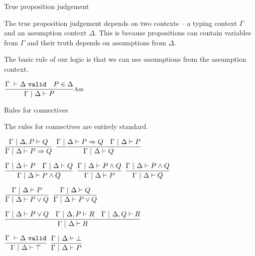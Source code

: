 \documentclass{beamer}
\begin{document}
\begin{frame}{True proposition judgement}

The true proposition judgement depends on two contexts -- a typing context $\Gamma$ and an assumption context $\Delta$. This is because propositions can contain variables from $\Gamma$ and their truth depends on assumptions from $\Delta$.

\vspace{1em}

The basic rule of our logic is that we can use assumptions from the assumption context.

\vspace{2em}

\begin{center}
  $\infrule[Ass]{\assctx{\Delta} \quad \sidecond{P \in \Delta}}{\holds{P}}$
\end{center}

\end{frame}

\begin{frame}{Rules for connectives}

The rules for connectives are entirely standard.

\vspace{1em}

\begin{center}
  $\infrule{\holds[\Gamma][\assume{\Delta}{P}]{Q}}{\holds{\Impl{P}{Q}}}$ \quad
  $\infrule{\holds{\Impl{P}{Q}} \quad \holds{P}}{\holds{Q}}$

  \vspace{1em}

  $\infrule{\holds{P} \quad \holds{Q}}{\holds{\And{P}{Q}}}$ \quad
  $\infrule{\holds{\And{P}{Q}}}{\holds{P}}$ \quad
  $\infrule{\holds{\And{P}{Q}}}{\holds{Q}}$

  \vspace{1em}

  $\infrule{\holds{P}}{\holds{\Or{P}{Q}}}$ \quad
  $\infrule{\holds{Q}}{\holds{\Or{P}{Q}}}$

  \vspace{1em}

  $\infrule{\holds{\Or{P}{Q}} \quad \holds[\Gamma][\assume{\Delta}{P}]{R} \quad \holds[\Gamma][\assume{\Delta}{Q}]{R}}{\holds{R}}$

  \vspace{1em}

  $\infrule{\assctx{\Delta}}{\holds{\True}}$ \quad
  $\infrule{\holds{\False}}{\holds{P}}$
\end{center}

\end{frame}
\end{document}
